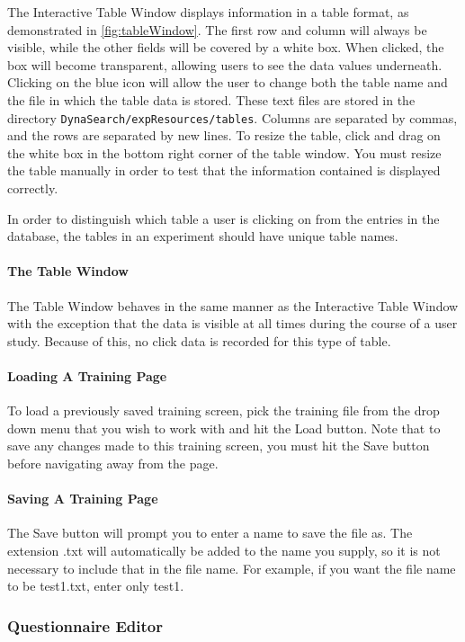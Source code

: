 \documentclass[article]{ij4uq}              %
\begin{document}
The Interactive Table Window displays information in a table format, as demonstrated in \ref{fig:tableWindow}.  The first row and column will always be visible, while the other fields will be covered by a white box.  When clicked, the box will become transparent, allowing users to see the data values underneath.  Clicking on the blue icon will allow the user to change both the table name and the file in which the table data is stored. These text files are stored in the directory \texttt{DynaSearch/expResources/tables}.  Columns are separated by commas, and the rows are separated by new lines. To resize the table, click and drag on the white box in the bottom right corner of the table window. You must resize the table manually in order to test that the information contained is displayed correctly.

In order to distinguish which table a user is clicking on from the entries in the database, the tables in an experiment should have unique table names.

\paragraph{The Table Window}

The Table Window behaves in the same manner as the Interactive Table Window with the exception that the data is visible at all times during the course of a user study.  Because of this, no click data is recorded for this type of table.

\paragraph{Loading A Training Page}
To load a previously saved training screen, pick the training file from the drop down menu that you wish to work with and hit the Load button. Note that to save any changes made to this training screen, you must hit the Save button before navigating away from the page.

\paragraph{Saving A Training Page}
The Save button will prompt you to enter a name to save the file as. The extension .txt will automatically be added to the name you supply, so it is not necessary to include that in the file name. For example, if you want the file name to be test1.txt, enter only test1.

\subsubsection {Questionnaire Editor}
\end{document}

